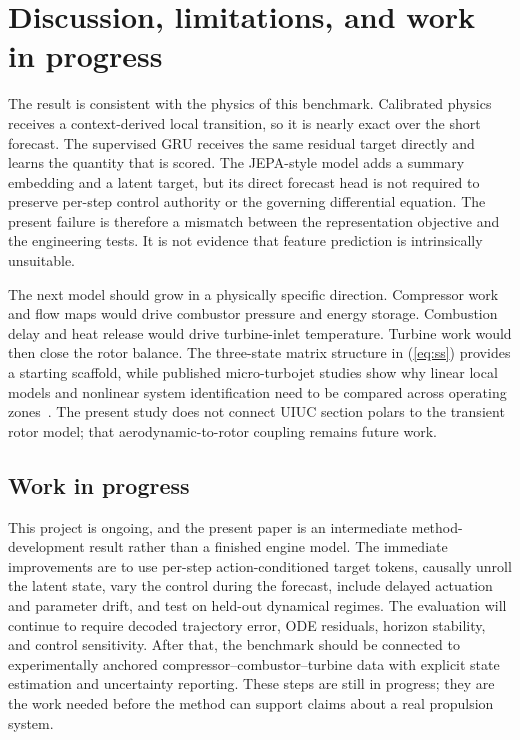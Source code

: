 \documentclass[10pt,journal]{IEEEtran}
\begin{document}
\section{Discussion, limitations, and work in progress}
The result is consistent with the physics of this benchmark. Calibrated physics receives a context-derived local transition, so it is nearly exact over the short forecast. The supervised GRU receives the same residual target directly and learns the quantity that is scored. The JEPA-style model adds a summary embedding and a latent target, but its direct forecast head is not required to preserve per-step control authority or the governing differential equation. The present failure is therefore a mismatch between the representation objective and the engineering tests. It is not evidence that feature prediction is intrinsically unsuitable.

The next model should grow in a physically specific direction. Compressor work and flow maps would drive combustor pressure and energy storage. Combustion delay and heat release would drive turbine-inlet temperature. Turbine work would then close the rotor balance. The three-state matrix structure in (\ref{eq:ss}) provides a starting scaffold, while published micro-turbojet studies show why linear local models and nonlinear system identification need to be compared across operating zones~\cite{beneda2018spool,shehata2024microturbojet}. The present study does not connect UIUC section polars to the transient rotor model; that aerodynamic-to-rotor coupling remains future work.

\subsection{Work in progress}
This project is ongoing, and the present paper is an intermediate method-development result rather than a finished engine model. The immediate improvements are to use per-step action-conditioned target tokens, causally unroll the latent state, vary the control during the forecast, include delayed actuation and parameter drift, and test on held-out dynamical regimes. The evaluation will continue to require decoded trajectory error, ODE residuals, horizon stability, and control sensitivity. After that, the benchmark should be connected to experimentally anchored compressor--combustor--turbine data with explicit state estimation and uncertainty reporting. These steps are still in progress; they are the work needed before the method can support claims about a real propulsion system.
\end{document}
